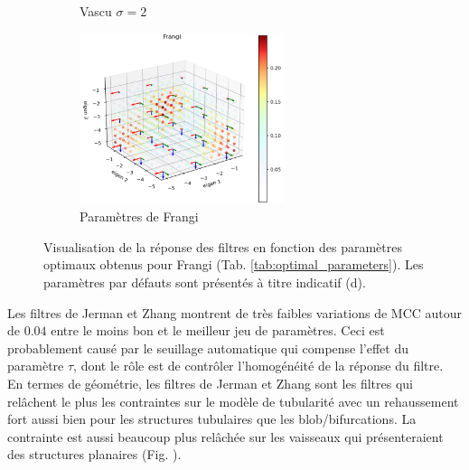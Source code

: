 \begin{figure}[H]
\begin{subfigure}[t]{0.45\textwidth}
    \caption{Vascu $\sigma=2$}
  \end{subfigure}
  \begin{subfigure}[t]{0.45\textwidth}
    \includegraphics[height=5cm]{Images/Frangi_default_P.png}
    \caption{Paramètres de Frangi}
  \end{subfigure}
  \caption{Visualisation de la réponse des filtres en fonction des paramètres optimaux obtenus pour Frangi (Tab. \ref{tab:optimal_parameters}). Les paramètres par défauts sont présentés à titre indicatif (d).}
  \label{fig:exemple_geometry_frangi}
\end{figure}


Les filtres de Jerman et Zhang montrent de très faibles variations de MCC autour de $0.04$ entre le moins bon et le meilleur jeu de paramètres. Ceci est probablement causé par le seuillage automatique qui compense l'effet du paramètre $\tau$, dont le rôle est de contrôler l'homogénéité de la réponse du filtre. En termes de géométrie, les filtres de Jerman et Zhang sont les filtres qui relâchent le plus les contraintes sur le modèle de tubularité avec un rehaussement fort aussi bien pour les structures tubulaires que les blob/bifurcations. La contrainte est aussi beaucoup plus relâchée sur les vaisseaux qui présenteraient des structures planaires (Fig. \cite{fig:exemple_geometry_jerman}).

